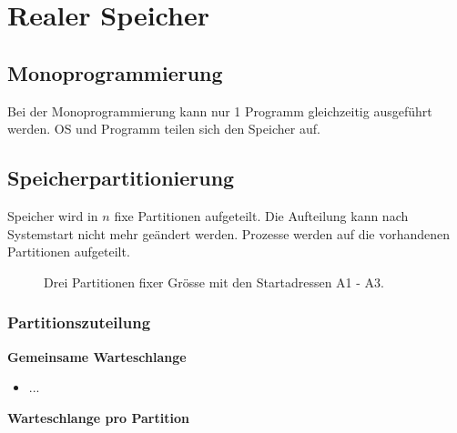 \section{Realer Speicher}

\subsection{Monoprogrammierung}

Bei der Monoprogrammierung kann nur 1 Programm gleichzeitig ausgeführt werden.
OS und Programm teilen sich den Speicher auf.

\subsection{Speicherpartitionierung}

Speicher wird in $n$ fixe Partitionen aufgeteilt. Die Aufteilung kann nach
Systemstart nicht mehr geändert werden. Prozesse werden auf die vorhandenen
Partitionen aufgeteilt.

\begin{figure}[H]


	\caption{Drei Partitionen fixer Grösse mit den Startadressen A1 - A3.}

\end{figure}

\subsubsection{Partitionszuteilung}

\textbf{Gemeinsame Warteschlange}

\begin{itemize}
	\item ...
\end{itemize}

\textbf{Warteschlange pro Partition}

